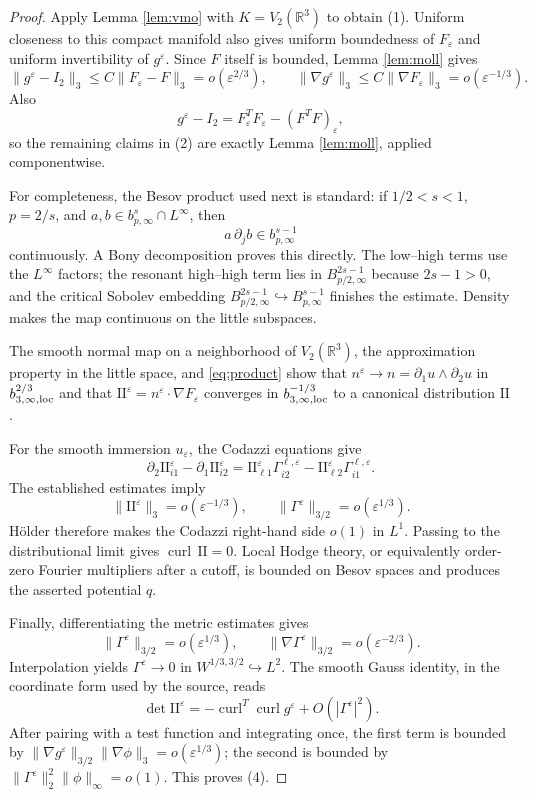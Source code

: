\documentclass[11pt]{article}
\newcommand{\R}{\mathbb R}
\newcommand{\eps}{\varepsilon}
\newcommand{\curl}{\operatorname{curl}}
\begin{document}
\begin{proof}
Apply Lemma \ref{lem:vmo} with $K=V_2(\R^3)$ to obtain (1).  Uniform
closeness to this compact manifold also gives uniform boundedness of $F_\eps$
and uniform invertibility of $g^\eps$.  Since $F$ itself is bounded,
Lemma \ref{lem:moll} gives
\[
 \|g^\eps-I_2\|_3
 \leq C\|F_\eps-F\|_3=o(\eps^{2/3}),
 \qquad
 \|\nabla g^\eps\|_3
 \leq C\|\nabla F_\eps\|_3=o(\eps^{-1/3}).
\]
Also
\[
 g^\eps-I_2=F_\eps^TF_\eps-(F^TF)_\eps,
\]
so the remaining claims in (2) are exactly Lemma \ref{lem:moll}, applied
componentwise.

For completeness, the Besov product used next is standard: if
$1/2<s<1$, $p=2/s$, and $a,b\in b^s_{p,\infty}\cap L^\infty$, then
\begin{equation}\label{eq:product}
 a\,\partial_jb\in b^{s-1}_{p,\infty}
\end{equation}
continuously.  A Bony decomposition proves this directly.  The low--high
terms use the $L^\infty$ factors; the resonant high--high term lies in
$B^{2s-1}_{p/2,\infty}$ because $2s-1>0$, and the critical Sobolev embedding
$B^{2s-1}_{p/2,\infty}\hookrightarrow B^{s-1}_{p,\infty}$ finishes the
estimate.  Density makes the map continuous on the little subspaces.

The smooth normal map on a neighborhood of $V_2(\R^3)$, the approximation
property in the little space, and \eqref{eq:product} show that
$n^\eps\to n=\partial_1u\wedge\partial_2u$ in
$b^{2/3}_{3,\infty,\rm loc}$ and that
$\mathrm{II}^\eps=n^\eps\cdot\nabla F_\eps$ converges in
$b^{-1/3}_{3,\infty,\rm loc}$ to a canonical distribution
$\mathrm{II}$.

For the smooth immersion $u_\eps$, the Codazzi equations give
\[
 \partial_2\mathrm{II}^\eps_{i1}
 -\partial_1\mathrm{II}^\eps_{i2}
 =\mathrm{II}^\eps_{\ell1}\Gamma^{\ell,\eps}_{i2}
  -\mathrm{II}^\eps_{\ell2}\Gamma^{\ell,\eps}_{i1}.
\]
The established estimates imply
\[
 \|\mathrm{II}^\eps\|_3=o(\eps^{-1/3}),
 \qquad
 \|\Gamma^\eps\|_{3/2}=o(\eps^{1/3}).
\]
H\"older therefore makes the Codazzi right-hand side $o(1)$ in $L^1$.
Passing to the distributional limit gives $\curl\,\mathrm{II}=0$.
Local Hodge theory, or equivalently order-zero Fourier multipliers after a
cutoff, is bounded on Besov spaces and produces the asserted potential $q$.

Finally, differentiating the metric estimates gives
\[
 \|\Gamma^\eps\|_{3/2}=o(\eps^{1/3}),
 \qquad
 \|\nabla\Gamma^\eps\|_{3/2}=o(\eps^{-2/3}).
\]
Interpolation yields
$\Gamma^\eps\to0$ in $W^{1/3,3/2}\hookrightarrow L^2$.  The smooth Gauss
identity, in the coordinate form used by the source, reads
\[
 \det\mathrm{II}^\eps
 =-\curl^T\curl g^\eps+O(|\Gamma^\eps|^2).
\]
After pairing with a test function and integrating once, the first term is
bounded by
$\|\nabla g^\eps\|_{3/2}\|\nabla\phi\|_3=o(\eps^{1/3})$; the second is
bounded by $\|\Gamma^\eps\|_2^2\|\phi\|_\infty=o(1)$.  This proves (4).
\end{proof}
\end{document}
